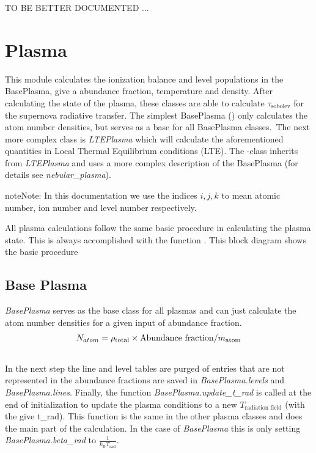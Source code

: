 \documentclass[letterpaper,10pt,english]{sphinxmanual}
\begin{document}
TO BE BETTER DOCUMENTED ...


\chapter{Plasma}
\label{plasma:plasma}\label{plasma:plasmas}\label{plasma::doc}
This module calculates the ionization balance and level populations in the BasePlasma, give a abundance fraction, temperature
and density. After calculating the state of the plasma, these classes are able to calculate $\tau_\textrm{sobolev}$
for the supernova radiative transfer. The simplest BasePlasma () only calculates the atom number densities, but serves
as a base for all BasePlasma classes. The next more complex class is \emph{LTEPlasma} which will calculate the aforementioned quantities in
Local Thermal Equilibrium conditions (LTE). The -class inherits from \emph{LTEPlasma} and uses a more complex
description of the BasePlasma (for details see \emph{nebular\_plasma}).

\begin{notice}{note}{Note:}
In this documentation we use the indices $i, j, k$ to mean atomic number, ion number and level number respectively.
\end{notice}

All plasma calculations follow the same basic procedure in calculating the plasma state.
This is always accomplished with the function . This block diagram shows the basic procedure


\section{Base Plasma}
\label{plasma:base-plasma}
\emph{BasePlasma} serves as the base class for all plasmas and can just calculate the atom number densities for a given input of
abundance fraction.
\begin{gather}
\begin{split}N_{atom} = \rho_\textrm{total} \times \textrm{Abundance fraction} / m_\textrm{atom}\end{split}\notag\\\begin{split}\end{split}\notag
\end{gather}
In the next step the line and level tables are purged of entries that are not represented in the
abundance fractions are saved in \emph{BasePlasma.levels} and \emph{BasePlasma.lines}. Finally, the function \emph{BasePlasma.update\_t\_rad} is called
at the end of initialization to update the plasma conditions to a new $T_\textrm{radiation field}$ (with the give t\_rad).
This function is the same in the other plasma classes and does the main part of the calculation. In the case of \emph{BasePlasma} this is only
setting \emph{BasePlasma.beta\_rad} to $\frac{1}{k_\textrm{B}T_\textrm{rad}}$.
\end{document}

